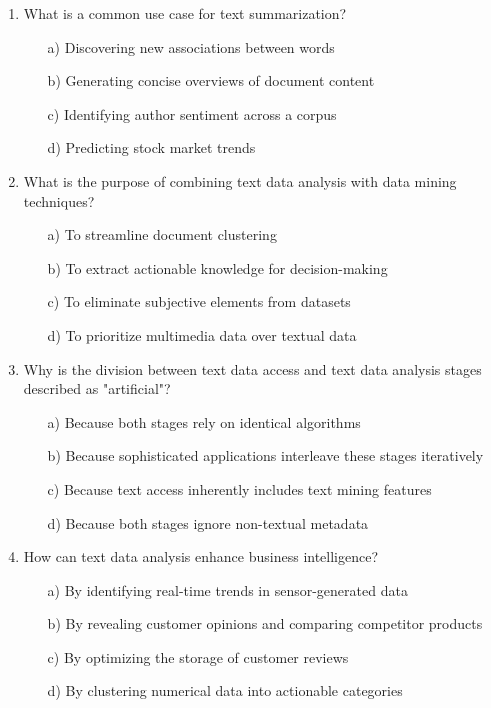 \documentclass[8pt]{extarticle}
\begin{document}
\begin{multicols}{2}
\begin{enumerate}
\item What is a common use case for text summarization?
\begin{itemize}
\item[a)] Discovering new associations between words
\item[b)] Generating concise overviews of document content
\item[c)] Identifying author sentiment across a corpus
\item[d)] Predicting stock market trends
\end{itemize}

\item What is the purpose of combining text data analysis with data mining techniques?
\begin{itemize}
\item[a)] To streamline document clustering
\item[b)] To extract actionable knowledge for decision-making
\item[c)] To eliminate subjective elements from datasets
\item[d)] To prioritize multimedia data over textual data
\end{itemize}

\item Why is the division between text data access and text data analysis stages described as "artificial"?
\begin{itemize}
\item[a)] Because both stages rely on identical algorithms
\item[b)] Because sophisticated applications interleave these stages iteratively
\item[c)] Because text access inherently includes text mining features
\item[d)] Because both stages ignore non-textual metadata
\end{itemize}

\item How can text data analysis enhance business intelligence?
\begin{itemize}
\item[a)] By identifying real-time trends in sensor-generated data
\item[b)] By revealing customer opinions and comparing competitor products
\item[c)] By optimizing the storage of customer reviews
\item[d)] By clustering numerical data into actionable categories
\end{itemize}


\end{enumerate}
\end{multicols}
\end{document}
